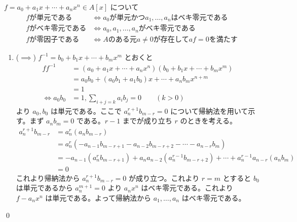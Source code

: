 \documentclass[uplatex,dvipdfmx,a4paper,11pt]{jlreq}
\makeatletter
\theoremstyle{definition}
\renewenvironment{proof}[1][\proofname]{\par
  \normalfont
  \topsep6\p@\@plus6\p@ \trivlist
  \item[\hskip\labelsep{\bfseries #1}\@addpunct{\bfseries}]\ignorespaces\quad\par
}{%
  \qed\endtrivlist\@endpefalse
}
\renewcommand\proofname{証明}
\makeatother
\begin{document}
\begin{proposition}
  $f = a_0 + a_1x + \cdots + a_nx^n\in A[x]$ について
  \begin{align}
    f が単元である   & \iff a_0 が単元かつ a_1,\ldots,a_n はベキ零元である \\
    f がベキ零元である & \iff a_0,a_1,\ldots,a_n がベキ零元である       \\
    f が零因子である  & \iff A のある元 a \neq 0 が存在して af = 0 を満たす
  \end{align}
\end{proposition}
\begin{proof}
  \begin{enumerate}
    \item ($\implies$) $f^{-1} = b_0 + b_1x + \cdots + b_mx^m$ とおくと
          \begin{align}
            ff^{-1}     & = (a_0 + a_1x + \cdots + a_nx^n)(b_0 + b_1x + \cdots + b_mx^m) \\
                        & = a_0b_0 + (a_0b_1 + a_1b_0)x + \cdots + a_nb_mx^{n+m}         \\
                        & = 1                                                            \\
            \iff a_0b_0 & = 1, \sum_{i + j = k}a_ib_j = 0 \qquad (k > 0)
          \end{align}
          より $a_0, b_0$ は単元である。ここで $a_n^{r + 1}b_{m - r} = 0$ について帰納法を用いて示す。まず $a_nb_m = 0$ である。$r - 1$ までが成り立ち $r$ のときを考える。
          \begin{align}
            a_n^{r+1}b_{m-r} & = a_n^r(a_nb_{m-r})                                                                              \\
                             & = a_n^r(- a_{n-1}b_{m-r+1} - a_{n-2}b_{m-r+2} - \cdots - a_{n-r}b_m)                             \\
                             & = - a_{n-1}(a_n^rb_{m-r+1}) + a_na_{n-2}(a_n^{r-1}b_{m-r+2}) + \cdots + a_n^{r-1}a_{n-r}(a_nb_m) \\
                             & = 0
          \end{align}
          これより帰納法から $a_n^{r + 1}b_{m - r} = 0$ が成り立つ。これより $r = m$ とすると $b_0$ は単元であるから $a_n^{m+1} = 0$ より $a_nx^n$ はベキ零元である。これより $f - a_nx^n$ は単元である。よって帰納法から $a_1,\ldots,a_n$ はベキ零元である。


\end{enumerate}
\end{proof}
\end{document}
